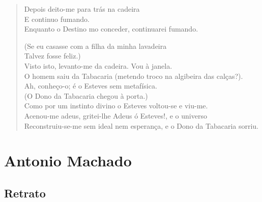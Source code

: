 \documentclass[10pt,a5paper,oneside]{book}
\begin{document}
\begin{verse}
Depois deito-me para trás na cadeira\\
E continuo fumando.\\
Enquanto o Destino mo conceder, continuarei fumando.

(Se eu casasse com a filha da minha lavadeira\\
Talvez fosse feliz.)\\
Visto isto, levanto-me da cadeira. Vou à janela.\\
O homem saiu da Tabacaria (metendo troco na algibeira das calças?).\\
Ah, conheço-o; é o Esteves sem metafísica.\\
(O Dono da Tabacaria chegou à porta.)\\
Como por um instinto divino o Esteves voltou-se e viu-me.\\
Acenou-me adeus, gritei-lhe Adeus ó Esteves!, e o universo\\
Reconstruiu-se-me sem ideal nem esperança, e o Dono da Tabacaria sorriu.
\end{verse}

\part{Antonio Machado}

\chapter{Retrato}
\end{document}
